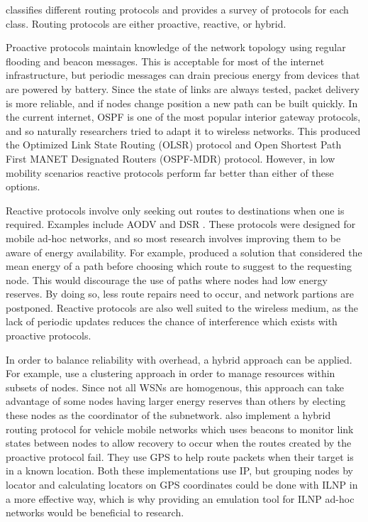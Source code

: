 \documentclass[12pt]{article}
\begin{document}
\cite{hassan} classifies different routing protocols and provides a survey of protocols for each class. Routing protocols are either proactive, reactive, or hybrid. 

Proactive protocols maintain knowledge of the network topology using regular flooding and beacon messages. This is acceptable for most of the internet infrastructure, but periodic messages can drain precious energy from devices that are powered by battery. Since the state of links are always tested, packet delivery is more reliable, and if nodes change position a new path can be built quickly. In the current internet, OSPF is one of the most popular interior gateway protocols, and so naturally researchers tried to adapt it to wireless networks. This produced the Optimized Link State Routing (OLSR) protocol \cite{olsr} and Open Shortest Path First MANET Designated Routers (OSPF-MDR) protocol. However, in low mobility scenarios reactive protocols perform far better than either of these options. 

Reactive protocols involve only seeking out routes to destinations when one is required. Examples include AODV \cite{aodv} and DSR \cite{dsr}. These protocols were designed for mobile ad-hoc networks, and so most research involves improving them to be aware of energy availability. For example, \cite{eaodv} produced a solution that considered the mean energy of a path before choosing which route to suggest to the requesting node. This would discourage the use of paths where nodes had low energy reserves. By doing so, less route repairs need to occur, and network partions are postponed. Reactive protocols are also well suited to the wireless medium, as the lack of periodic updates reduces the chance of interference which exists with proactive protocols.

In order to balance reliability with overhead, a hybrid approach can be applied. For example, \cite{cluster} use a clustering approach in order to manage resources within subsets of nodes. Since not all WSNs are homogenous, this approach can take advantage of some nodes having larger energy reserves than others by electing these nodes as the coordinator of the subnetwork. \cite{vanet} also implement a hybrid routing protocol for vehicle mobile networks which uses beacons to monitor link states between nodes to allow recovery to occur when the routes created by the proactive protocol fail. They use GPS to help route packets when their target is in a known location. Both these implementations use IP, but grouping nodes by locator and calculating locators on GPS coordinates could be done with ILNP in a more effective way, which is why providing an emulation tool for ILNP ad-hoc networks would be beneficial to research.
\end{document}
